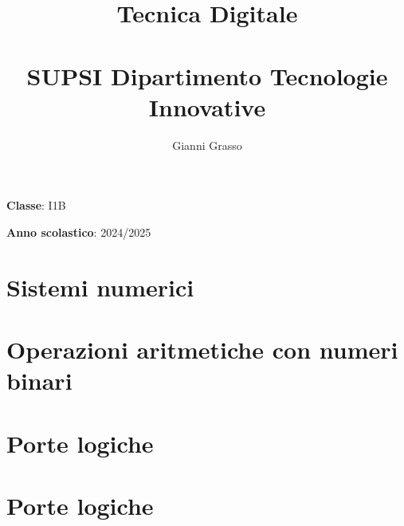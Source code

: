 \documentclass{article}
\title{
    Tecnica Digitale \\
    \phantom{}\\
    \large SUPSI Dipartimento Tecnologie Innovative
}
\author{Gianni Grasso}
\begin{document}
\maketitle
\hphantom{ }
\vspace{14.5cm}

\textbf{Classe}: I1B

\textbf{Anno scolastico}: 2024/2025
\pagebreak


\tableofcontents
\pagebreak

\section{Sistemi numerici}

\pagebreak

\section{Operazioni aritmetiche con numeri binari}

\pagebreak

\section{Porte logiche}

\pagebreak

\section{Porte logiche}

\pagebreak
\end{document}
